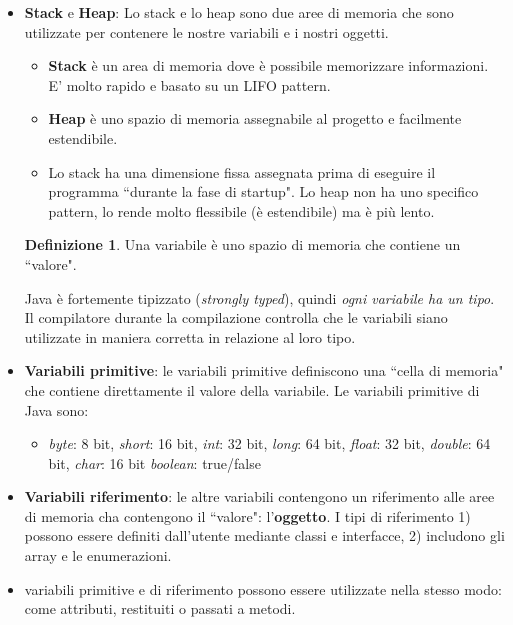 \documentclass{article}
\theoremstyle{definition}
\newtheorem{mydef}{Definizione}
\begin{document}
\begin{itemize}
\item \textbf{Stack} e \textbf{Heap}:  Lo stack e lo heap sono due aree di memoria che sono utilizzate per contenere le nostre variabili e i nostri oggetti.
\begin{itemize}
\item \textbf{Stack} \`e un area di memoria dove \`e possibile memorizzare informazioni. E' molto rapido e basato su un LIFO pattern.
\item \textbf{Heap} \`e uno spazio di memoria assegnabile al progetto e facilmente 
estendibile. 
\item Lo stack ha una dimensione fissa assegnata prima di eseguire il programma ``durante la fase di startup". Lo heap non ha uno specifico pattern, lo rende molto flessibile (\`e estendibile) ma \`e pi\`u lento. 
\end{itemize}


\begin{mydef} Una variabile \`e uno spazio di memoria che contiene un ``valore". 
\end{mydef}
Java \`e fortemente tipizzato (\emph{strongly typed}), quindi \emph{ogni variabile ha un tipo}. Il compilatore durante la compilazione controlla che le variabili siano utilizzate in maniera corretta in relazione al loro tipo.\\

\item \textbf{Variabili primitive}: le variabili primitive definiscono una ``cella di memoria" che contiene direttamente il valore della variabile. Le variabili primitive di Java sono:
\begin{itemize}
\item \emph{byte}: 8 bit, \emph{short}: 16 bit, \emph{int}: 32 bit, \emph{long}: 64 bit, \emph{float}: 32 bit, \emph{double}: 64 bit, \emph{char}: 16 bit \emph{boolean}: true/false
\end{itemize}
\item \textbf{Variabili riferimento}: le altre variabili contengono un riferimento alle aree di memoria cha contengono il ``valore": l'\textbf{oggetto}. I tipi di riferimento 1) possono essere definiti dall'utente mediante classi e interfacce, 2) includono gli array e le enumerazioni.
\item variabili primitive e di riferimento possono essere utilizzate nella stesso modo: come attributi, restituiti o passati a metodi.
\end{itemize}
\end{document}
